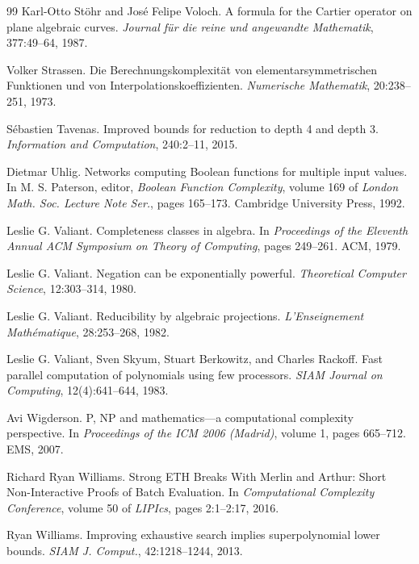 \begin{thebibliography}{99}
Karl-Otto Stöhr and José Felipe Voloch. A formula for the Cartier operator on plane algebraic
curves. \emph{Journal für die reine und angewandte Mathematik}, 377:49--64, 1987.

Volker Strassen. Die Berechnungskomplexität von elementarsymmetrischen Funktionen und von
Interpolationskoeffizienten. \emph{Numerische Mathematik}, 20:238--251, 1973.

Sébastien Tavenas. Improved bounds for reduction to depth 4 and depth 3. \emph{Information and
Computation}, 240:2--11, 2015.

Dietmar Uhlig. Networks computing Boolean functions for multiple input values. In M. S.
Paterson, editor, \emph{Boolean Function Complexity}, volume 169 of \emph{London Math. Soc. Lecture Note
Ser.}, pages 165--173. Cambridge University Press, 1992.

Leslie G. Valiant. Completeness classes in algebra. In \emph{Proceedings of the Eleventh Annual ACM
Symposium on Theory of Computing}, pages 249--261. ACM, 1979.

Leslie G. Valiant. Negation can be exponentially powerful. \emph{Theoretical Computer Science},
12:303--314, 1980.

Leslie G. Valiant. Reducibility by algebraic projections. \emph{L'Enseignement Mathématique}, 28:253--268, 1982.

Leslie G. Valiant, Sven Skyum, Stuart Berkowitz, and Charles Rackoff. Fast parallel computation
of polynomials using few processors. \emph{SIAM Journal on Computing}, 12(4):641--644, 1983.

Avi Wigderson. P, NP and mathematics---a computational complexity perspective. In \emph{Proceedings
of the ICM 2006 (Madrid)}, volume 1, pages 665--712. EMS, 2007.

Richard Ryan Williams. Strong ETH Breaks With Merlin and Arthur: Short Non-Interactive
Proofs of Batch Evaluation. In \emph{Computational Complexity Conference}, volume 50 of \emph{LIPIcs},
pages 2:1--2:17, 2016.

Ryan Williams. Improving exhaustive search implies superpolynomial lower bounds. \emph{SIAM J.
Comput.}, 42:1218--1244, 2013.
\end{thebibliography}

